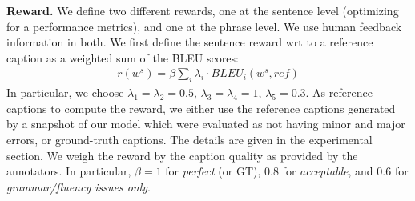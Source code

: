 \iffalse
Using chain rule, the final gradient formula is:\\
\begin{equation}
\begin{aligned}
&\nabla_{\theta} L(\theta) = \sum_{t=1}^{T} \frac{\partial L(\theta)}{\partial s_t}\frac{\partial \partial s_t}{\partial \theta}\\
&\frac{\partial L(\theta)}{\partial s_t}  \approx (r(w^s)-r(\hat{w}))(p_\theta(w_t|h_t) - 1_{w_t^s})
&
 \end{aligned}
\end{equation}
\fi



{\bf Reward.} We define two different rewards, one at the sentence level (optimizing for a performance metrics), and one at the phrase level. We use human feedback information in both. We first define the sentence reward wrt to a reference caption as a weighted sum of the BLEU scores:
\begin{equation}
\begin{aligned}
&r(w^s) = \beta \sum_i \lambda_{i} \cdot BLEU_i (w^s,ref) %
&
 \end{aligned}
\end{equation}
In particular, we choose $\lambda_{1}=\lambda_{2}=0.5$, $\lambda_{3}=\lambda_{4}=1$, $\lambda_{5}=0.3$. As reference captions to compute the reward, we either use the reference captions generated by a snapshot of our model which were evaluated as not having minor and major errors, or ground-truth captions. %
The details are given in the experimental section. 
We weigh the reward by the caption quality as provided by the annotators. In particular, $\beta=1$ for \emph{perfect} (or GT), $0.8$ for \emph{acceptable}, and $0.6$ for \emph{grammar/fluency issues only}. %

